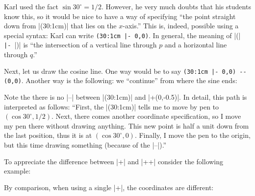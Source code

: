 Karl used the fact $\sin 30^\circ = 1/2$. However, he very much
doubts that his students know this, so it would be nice to have a way
of specifying ``the point straight down from |(30:1cm)| that lies on
the $x$-axis.'' This is, indeed, possible using a special syntax: Karl
can write \verb!(30:1cm |- 0,0)!. In general, the meaning of
|(|\verb! |- !|)| is ``the intersection of a vertical
line through $p$ and a horizontal line through $q$.''

Next, let us draw the cosine line. One way would be to say
\verb!(30:1cm |- 0,0) -- (0,0)!. Another way is the following: we
``continue'' from where the sine ends: 

\begin{codeexample}[]
\end{codeexample}

Note the there is no |--| between |(30:1cm)| and |+(0,-0.5)|. In
detail, this path is interpreted as follows: ``First, the |(30:1cm)|
tells me to move by pen to $(\cos 30^\circ,1/2)$. Next, there comes
another coordinate specification, so I move my pen there without drawing
anything. This new point is half a unit down from the last position,
thus it is at $(\cos 30^\circ,0)$. Finally, I move the pen to the
origin, but this time drawing something (because of the |--|).''

To appreciate the difference between |+| and |++| consider the
following example:

\begin{codeexample}[]
\end{codeexample}

By comparison, when using a single |+|, the coordinates are different:

\begin{codeexample}[]
\end{codeexample}


